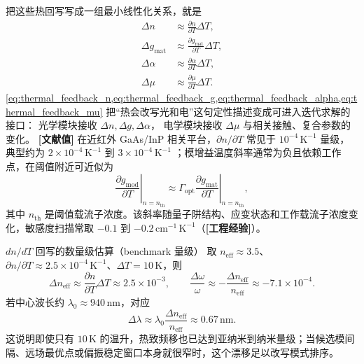 把这些热回写写成一组最小线性化关系，就是
\begin{align}
\Delta n &\approx \frac{\partial n}{\partial T}\Delta T,
\label{eq:thermal_feedback_n}
\\
\Delta g_{\mathrm{mat}}
&\approx
\frac{\partial g_{\mathrm{mat}}}{\partial T}\Delta T,
\label{eq:thermal_feedback_g}
\\
\Delta \alpha
&\approx
\frac{\partial \alpha}{\partial T}\Delta T,
\label{eq:thermal_feedback_alpha}
\\
\Delta \mu
&\approx
\frac{\partial \mu}{\partial T}\Delta T.
\label{eq:thermal_feedback_mu}
\end{align}
\cref{eq:thermal_feedback_n,eq:thermal_feedback_g,eq:thermal_feedback_alpha,eq:thermal_feedback_mu}
把“热会改写光和电”这句定性描述变成可进入迭代求解的接口：
光学模块接收 $\Delta n,\Delta g,\Delta \alpha$，
电学模块接收 $\Delta \mu$ 与相关接触、复合参数的变化。
\textbf{[文献值]} 在近红外 GaAs/InP 相关平台，$\partial n/\partial T$
常见于 $10^{-4}\,\mathrm{K}^{-1}$ 量级，典型约为
$2\times10^{-4}\,\mathrm{K}^{-1}$ 到 $3\times10^{-4}\,\mathrm{K}^{-1}$
\cite{dellacorte2000thermooptic}；模增益温度斜率通常为负且依赖工作点，在阈值附近可近似为
\begin{equation}
\left.\frac{\partial g_{\mathrm{mod}}}{\partial T}\right|_{n=n_{\mathrm{th}}}
\approx
\Gamma_{\mathrm{opt}}
\left.\frac{\partial g_{\mathrm{mat}}}{\partial T}\right|_{n=n_{\mathrm{th}}},
\end{equation}
其中 $n_{\mathrm{th}}$ 是阈值载流子浓度。该斜率随量子阱结构、应变状态和工作载流子浓度变化，敏感度扫描常取 $-0.1$ 到 $-0.2\,\mathrm{cm}^{-1}\,\mathrm{K}^{-1}$（\textbf{[工程经验]}）。

\begin{NumericalInsightBox}{\texorpdfstring{$dn/dT$}{dn/dT} 回写的数量级估算（benchmark 量级）}
取 $n_{\mathrm{eff}}\approx 3.5$、$\partial n/\partial T\approx 2.5\times10^{-4}\,\mathrm{K}^{-1}$、$\Delta T=10\,\mathrm{K}$，则
\[
\Delta n_{\mathrm{eff}}\approx \frac{\partial n}{\partial T}\Delta T \approx 2.5\times10^{-3},
\qquad
\frac{\Delta \omega}{\omega}\approx-\frac{\Delta n_{\mathrm{eff}}}{n_{\mathrm{eff}}}\approx-7.1\times10^{-4}.
\]
若中心波长约 $\lambda_0\approx 940\,\mathrm{nm}$，对应
\[
\Delta\lambda\approx \lambda_0\frac{\Delta n_{\mathrm{eff}}}{n_{\mathrm{eff}}}\approx 0.67\,\mathrm{nm}.
\]
这说明即使只有 $10\,\mathrm{K}$ 的温升，热致频移也已达到亚纳米到纳米量级；当候选模间隔、远场最优点或偏振稳定窗口本身就很窄时，这个漂移足以改写模式排序。
\end{NumericalInsightBox}

